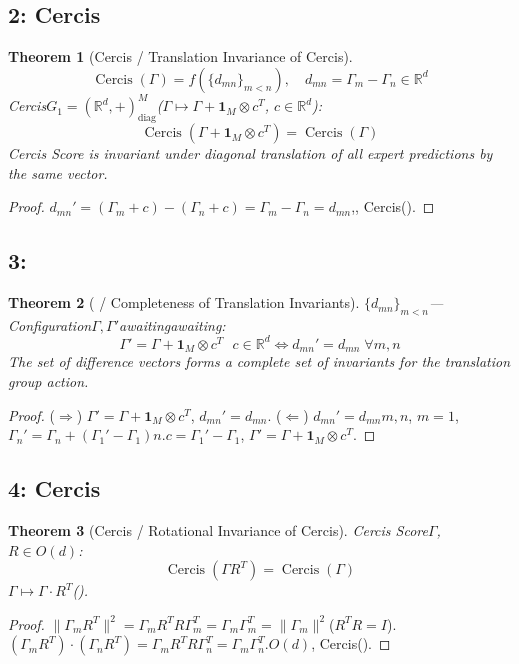 \documentclass[11pt,a4paper]{article}
\theoremstyle{plain}
\newtheorem{theorem}{Theorem}[section]
\theoremstyle{definition}
\theoremstyle{remark}
\newcommand{\RR}{\mathbb{R}}
\DeclareMathOperator{\Cercis}{Cercis}
\begin{document}
{\subsection{2: Cercis}
\begin{theorem}[Cercis / Translation Invariance of Cercis]
\label{thm:ilh-cercis-translation}
\begin{equation}
 \Cercis(\Gamma) = f\left(\{d_{mn}\}_{m<n}\right), \quad d_{mn} = \Gamma_m - \Gamma_n \in \RR^d
\end{equation}
Cercis$G_1 = (\RR^d, +)^M_{\text{diag}}$($\Gamma \mapsto \Gamma + \mathbf{1}_M \otimes c^T$, $c \in \RR^d$): 
\begin{equation}
\boxed{\Cercis(\Gamma + \mathbf{1}_M \otimes c^T) = \Cercis(\Gamma)}
\end{equation}
\textit{Cercis Score is invariant under diagonal translation of all expert predictions by the same vector.}
\end{theorem}
\begin{proof}
$d_{mn}' = (\Gamma_m + c) - (\Gamma_n + c) = \Gamma_m - \Gamma_n = d_{mn}$,, Cercis().
\end{proof}
\subsection{3:}
\begin{theorem}[ / Completeness of Translation Invariants]
\label{thm:ilh-completeness}
$\{d_{mn}\}_{m<n}$---Configuration$\Gamma, \Gamma'$awaitingawaiting: 
\begin{equation}
\boxed{\Gamma' = \Gamma + \mathbf{1}_M \otimes c^T \text{ } c \in \RR^d \iff d_{mn}' = d_{mn} \; \forall m,n}
\end{equation}
\textit{The set of difference vectors forms a complete set of invariants for the translation group action.}
\end{theorem}
\begin{proof}
($\Rightarrow$) $\Gamma' = \Gamma + \mathbf{1}_M \otimes c^T$, $d_{mn}' = d_{mn}$.
($\Leftarrow$) $d_{mn}' = d_{mn}$$m,n$, $m=1$, $\Gamma_n' = \Gamma_n + (\Gamma_1' - \Gamma_1)$$n$.$c = \Gamma_1' - \Gamma_1$, $\Gamma' = \Gamma + \mathbf{1}_M \otimes c^T$.
\end{proof}
\subsection{4: Cercis}
\begin{theorem}[Cercis / Rotational Invariance of Cercis]
\label{thm:ilh-cercis-rotation}
Cercis Score$\Gamma$, $R \in O(d)$: 
\begin{equation}
\boxed{\Cercis(\Gamma R^T) = \Cercis(\Gamma)}
\end{equation}
$\Gamma \mapsto \Gamma \cdot R^T$().
\end{theorem}
\begin{proof}
$\|\Gamma_m R^T\|^2 = \Gamma_m R^T R \Gamma_m^T = \Gamma_m \Gamma_m^T = \|\Gamma_m\|^2$($R^T R = I$).$(\Gamma_m R^T) \cdot (\Gamma_n R^T) = \Gamma_m R^T R \Gamma_n^T = \Gamma_m \Gamma_n^T$.$O(d)$, Cercis().
\end{proof}
}
\end{document}

